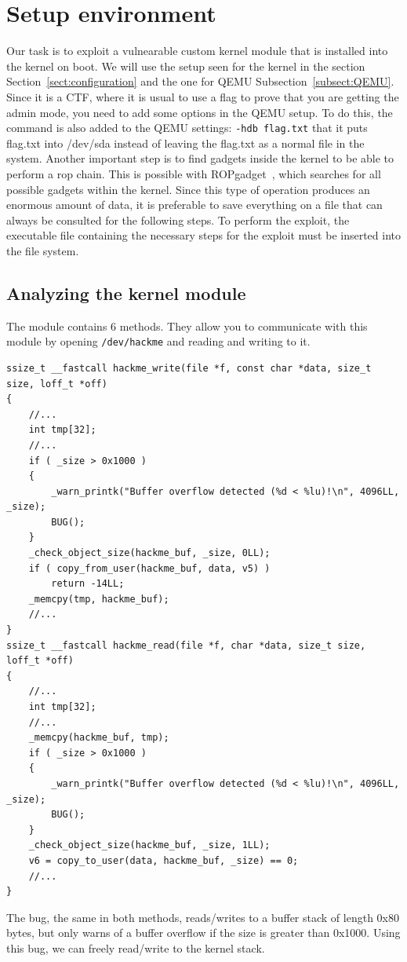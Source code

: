 \documentclass{masterthesis}
\newcommand{\refToSection}[1]{Section~\ref{sect:#1}\xspace}
\newcommand{\refToSubSection}[1]{Subsection~\ref{subsect:#1}\xspace}
\begin{document}
\section{Setup environment}
Our task is to exploit a vulnearable custom kernel module that is installed into the kernel on boot.
We will use the setup seen for the kernel in the section \refToSection{configuration} and the one for QEMU \refToSubSection{QEMU}.
Since it is a CTF, where it is usual to use a flag to prove that you are getting the admin mode, you need to add some options in the QEMU setup.
To do this, the command is also added to the QEMU settings:
\lstinline{-hdb flag.txt}
that it puts flag.txt into /dev/sda instead of leaving the flag.txt as a normal file in the system.
Another important step is to find gadgets inside the kernel to be able to perform a rop chain.
This is possible with ROPgadget~\cite{rop_gadget}, which searches for all possible gadgets within the kernel.
Since this type of operation produces an enormous amount of data, it is preferable to save everything on a file that can always be consulted for the following steps.
To perform the exploit, the executable file containing the necessary steps for the exploit must be inserted into the file system.
\subsection{Analyzing the kernel module}
\label{subsect:hackme}
The module contains 6 methods.
They allow you to communicate with this module by opening \lstinline{/dev/hackme} and reading and writing to it.
\begin{lstlisting}
ssize_t __fastcall hackme_write(file *f, const char *data, size_t size, loff_t *off)
{
    //...
    int tmp[32];
    //...
    if ( _size > 0x1000 )
    {
        _warn_printk("Buffer overflow detected (%d < %lu)!\n", 4096LL, _size);
        BUG();
    }
    _check_object_size(hackme_buf, _size, 0LL);
    if ( copy_from_user(hackme_buf, data, v5) )
        return -14LL;
    _memcpy(tmp, hackme_buf);
    //...
}
ssize_t __fastcall hackme_read(file *f, char *data, size_t size, loff_t *off)
{
    //...
    int tmp[32];
    //...
    _memcpy(hackme_buf, tmp);
    if ( _size > 0x1000 )
    {
        _warn_printk("Buffer overflow detected (%d < %lu)!\n", 4096LL, _size);
        BUG();
    }
    _check_object_size(hackme_buf, _size, 1LL);
    v6 = copy_to_user(data, hackme_buf, _size) == 0;
    //...
}
\end{lstlisting}
The bug, the same in both methods, reads/writes to a buffer stack of length 0x80 bytes, but only warns of a buffer overflow if the size is greater than 0x1000. Using this bug, we can freely read/write to the kernel stack.
\end{document}
